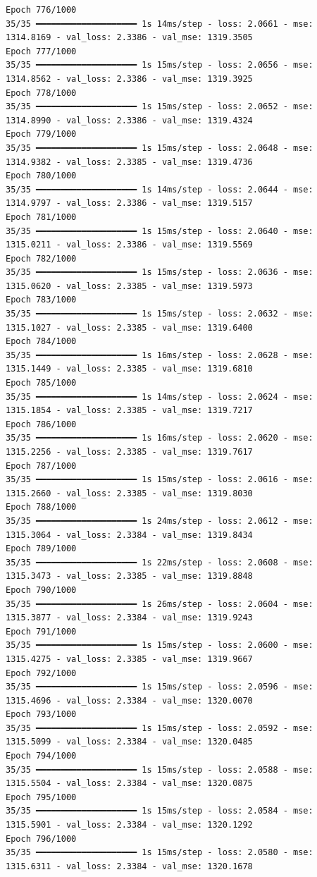 \documentclass[
  letterpaper,
  DIV=11,
  numbers=noendperiod]{scrreprt}
\begin{document}
\begin{verbatim}
Epoch 776/1000
35/35 ━━━━━━━━━━━━━━━━━━━━ 1s 14ms/step - loss: 2.0661 - mse: 1314.8169 - val_loss: 2.3386 - val_mse: 1319.3505
Epoch 777/1000
35/35 ━━━━━━━━━━━━━━━━━━━━ 1s 15ms/step - loss: 2.0656 - mse: 1314.8562 - val_loss: 2.3386 - val_mse: 1319.3925
Epoch 778/1000
35/35 ━━━━━━━━━━━━━━━━━━━━ 1s 15ms/step - loss: 2.0652 - mse: 1314.8990 - val_loss: 2.3386 - val_mse: 1319.4324
Epoch 779/1000
35/35 ━━━━━━━━━━━━━━━━━━━━ 1s 15ms/step - loss: 2.0648 - mse: 1314.9382 - val_loss: 2.3385 - val_mse: 1319.4736
Epoch 780/1000
35/35 ━━━━━━━━━━━━━━━━━━━━ 1s 14ms/step - loss: 2.0644 - mse: 1314.9797 - val_loss: 2.3386 - val_mse: 1319.5157
Epoch 781/1000
35/35 ━━━━━━━━━━━━━━━━━━━━ 1s 15ms/step - loss: 2.0640 - mse: 1315.0211 - val_loss: 2.3386 - val_mse: 1319.5569
Epoch 782/1000
35/35 ━━━━━━━━━━━━━━━━━━━━ 1s 15ms/step - loss: 2.0636 - mse: 1315.0620 - val_loss: 2.3385 - val_mse: 1319.5973
Epoch 783/1000
35/35 ━━━━━━━━━━━━━━━━━━━━ 1s 15ms/step - loss: 2.0632 - mse: 1315.1027 - val_loss: 2.3385 - val_mse: 1319.6400
Epoch 784/1000
35/35 ━━━━━━━━━━━━━━━━━━━━ 1s 16ms/step - loss: 2.0628 - mse: 1315.1449 - val_loss: 2.3385 - val_mse: 1319.6810
Epoch 785/1000
35/35 ━━━━━━━━━━━━━━━━━━━━ 1s 14ms/step - loss: 2.0624 - mse: 1315.1854 - val_loss: 2.3385 - val_mse: 1319.7217
Epoch 786/1000
35/35 ━━━━━━━━━━━━━━━━━━━━ 1s 16ms/step - loss: 2.0620 - mse: 1315.2256 - val_loss: 2.3385 - val_mse: 1319.7617
Epoch 787/1000
35/35 ━━━━━━━━━━━━━━━━━━━━ 1s 15ms/step - loss: 2.0616 - mse: 1315.2660 - val_loss: 2.3385 - val_mse: 1319.8030
Epoch 788/1000
35/35 ━━━━━━━━━━━━━━━━━━━━ 1s 24ms/step - loss: 2.0612 - mse: 1315.3064 - val_loss: 2.3384 - val_mse: 1319.8434
Epoch 789/1000
35/35 ━━━━━━━━━━━━━━━━━━━━ 1s 22ms/step - loss: 2.0608 - mse: 1315.3473 - val_loss: 2.3385 - val_mse: 1319.8848
Epoch 790/1000
35/35 ━━━━━━━━━━━━━━━━━━━━ 1s 26ms/step - loss: 2.0604 - mse: 1315.3877 - val_loss: 2.3384 - val_mse: 1319.9243
Epoch 791/1000
35/35 ━━━━━━━━━━━━━━━━━━━━ 1s 15ms/step - loss: 2.0600 - mse: 1315.4275 - val_loss: 2.3385 - val_mse: 1319.9667
Epoch 792/1000
35/35 ━━━━━━━━━━━━━━━━━━━━ 1s 15ms/step - loss: 2.0596 - mse: 1315.4696 - val_loss: 2.3384 - val_mse: 1320.0070
Epoch 793/1000
35/35 ━━━━━━━━━━━━━━━━━━━━ 1s 15ms/step - loss: 2.0592 - mse: 1315.5099 - val_loss: 2.3384 - val_mse: 1320.0485
Epoch 794/1000
35/35 ━━━━━━━━━━━━━━━━━━━━ 1s 15ms/step - loss: 2.0588 - mse: 1315.5504 - val_loss: 2.3384 - val_mse: 1320.0875
Epoch 795/1000
35/35 ━━━━━━━━━━━━━━━━━━━━ 1s 15ms/step - loss: 2.0584 - mse: 1315.5901 - val_loss: 2.3384 - val_mse: 1320.1292
Epoch 796/1000
35/35 ━━━━━━━━━━━━━━━━━━━━ 1s 15ms/step - loss: 2.0580 - mse: 1315.6311 - val_loss: 2.3384 - val_mse: 1320.1678

\end{verbatim}
\end{document}
